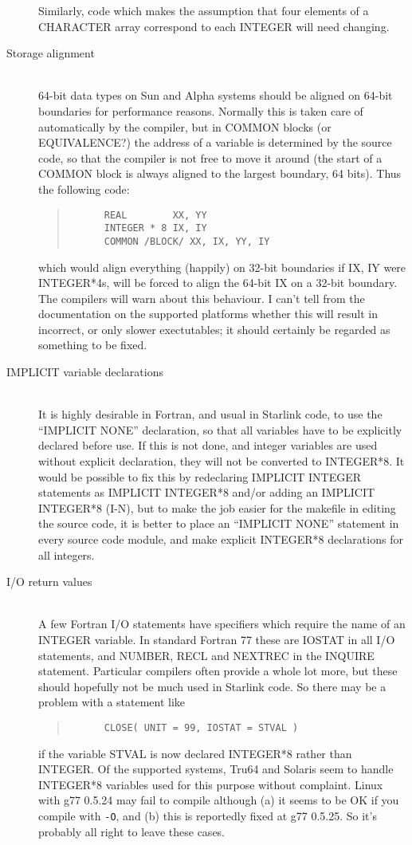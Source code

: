 \documentclass[twoside,11pt]{article}
\newcommand{\html}[1]{}
\renewcommand{\_}{\texttt{\symbol{95}}}
\newcommand{\ditem}[1]{\item[#1]\mbox{}\\}
\newenvironment{squote}{\begin{quote}\begin{small}}{\end{small}\end{quote}}
\begin{document}
\begin{description}
Similarly, code which makes the assumption that four elements of
a CHARACTER array correspond to each INTEGER will need changing.
%
\ditem{Storage alignment}
64-bit data types on Sun and Alpha systems should be aligned on 
64-bit boundaries for performance reasons.
Normally this is taken care of automatically by the compiler, 
but in COMMON blocks (or EQUIVALENCE?) the address of a 
variable is determined by the source code, so that the compiler
is not free to move it around (the start of a COMMON block is
always aligned to the largest boundary, 64 bits).
Thus the following code:
\begin{squote}
\begin{verbatim}
      REAL        XX, YY
      INTEGER * 8 IX, IY
      COMMON /BLOCK/ XX, IX, YY, IY
\end{verbatim}
\end{squote}
which would align everything (happily) on 32-bit boundaries if IX, IY
were INTEGER*4s, will be forced to align the 64-bit IX on a 32-bit
boundary.
The compilers will warn about this behaviour.
I can't tell from the documentation on the supported platforms whether
this will result in incorrect, or only slower exectutables;
it should certainly be regarded as something to be fixed.
\html{\begin{squote}\end{squote}}
%
\ditem{IMPLICIT variable declarations}
It is highly desirable in Fortran, and usual in Starlink code, to use
the ``IMPLICIT NONE'' declaration, so that all variables have to be
explicitly declared before use.
If this is not done, and integer variables are used without explicit
declaration, they will not be converted to INTEGER*8.
It would be possible to fix this by redeclaring IMPLICIT INTEGER
statements as IMPLICIT INTEGER*8 and/or adding an IMPLICIT INTEGER*8 (I-N), 
but to make the job easier for
the makefile in editing the source code, it is better to place
an ``IMPLICIT NONE'' statement in every source code module, and
make explicit INTEGER*8 declarations for all integers.
\html{\begin{squote}\end{squote}}
%
\ditem{I/O return values}
A few Fortran I/O statements have specifiers which require the name
of an INTEGER variable.  In standard Fortran 77 these are 
IOSTAT in all I/O statements, and 
NUMBER, RECL and NEXTREC in the INQUIRE statement.
Particular compilers often provide a whole lot more, but these
should hopefully not be much used in Starlink code.
So there may be a problem with a statement like
\begin{squote}
\begin{verbatim}
      CLOSE( UNIT = 99, IOSTAT = STVAL )
\end{verbatim}
\end{squote}
if the variable STVAL is now declared INTEGER*8 rather than INTEGER.
Of the supported systems, Tru64 and Solaris seem to handle 
INTEGER*8 variables used for this purpose without complaint.
Linux with g77 0.5.24 may fail to compile although (a) it seems to
be OK if you compile with {\tt -O}, and (b) this is reportedly
fixed at g77 0.5.25.  So it's probably all right to leave these cases.
%
\end{description}
\end{document}
